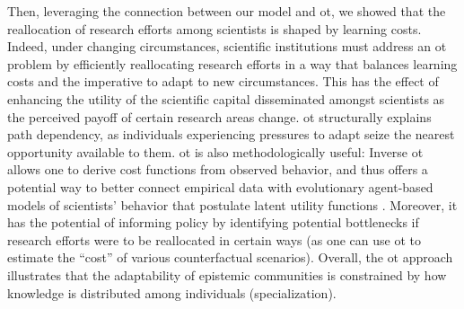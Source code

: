 \documentclass{article}
\begin{document}
Then, leveraging the connection between our model and \gls{ot}, we showed that the reallocation of research efforts among scientists is shaped by learning costs. Indeed, under changing circumstances, scientific institutions must address an \gls{ot} problem by efficiently reallocating research efforts in a way that balances learning costs and the imperative to adapt to new circumstances. This has the effect of enhancing the utility of the scientific capital disseminated amongst scientists as the perceived payoff of certain research areas change. \gls{ot} structurally explains path dependency, as individuals experiencing pressures to adapt seize the nearest opportunity available to them. \gls{ot} is also methodologically useful: Inverse \gls{ot} allows one to derive cost functions from observed behavior, and thus offers a potential way to better connect empirical data with evolutionary agent-based models of scientists' behavior that postulate latent utility functions \citep{Wu2023}. Moreover, it has the potential of informing policy by identifying potential bottlenecks if research efforts were to be reallocated in certain ways (as one can use \gls{ot} to estimate the ``cost'' of various counterfactual scenarios). Overall, the \gls{ot} approach illustrates that the adaptability of epistemic communities is constrained by how knowledge is distributed among individuals (specialization). %
\end{document}

